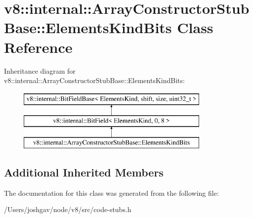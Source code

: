 \hypertarget{classv8_1_1internal_1_1_array_constructor_stub_base_1_1_elements_kind_bits}{}\section{v8\+:\+:internal\+:\+:Array\+Constructor\+Stub\+Base\+:\+:Elements\+Kind\+Bits Class Reference}
\label{classv8_1_1internal_1_1_array_constructor_stub_base_1_1_elements_kind_bits}
Inheritance diagram for v8\+:\+:internal\+:\+:Array\+Constructor\+Stub\+Base\+:\+:Elements\+Kind\+Bits\+:\begin{figure}[H]
\begin{center}
\leavevmode
\includegraphics[height=3.000000cm]{classv8_1_1internal_1_1_array_constructor_stub_base_1_1_elements_kind_bits}
\end{center}
\end{figure}
\subsection*{Additional Inherited Members}


The documentation for this class was generated from the following file\+:\begin{DoxyCompactItemize}
\item 
/\+Users/joshgav/node/v8/src/code-\/stubs.\+h\end{DoxyCompactItemize}
